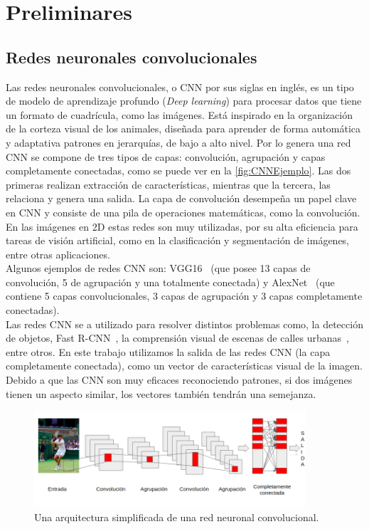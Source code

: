 \chapter{Preliminares}\label{cap:preliminares}


\section{Redes neuronales convolucionales} \label{sec:redesneuronalesconvolucionales}
Las redes neuronales convolucionales, o CNN por sus siglas en inglés, es un tipo de modelo de aprendizaje profundo (\textit{Deep learning}) para procesar datos que tiene un formato de cuadrícula, como las imágenes. Está inspirado en la organización de la corteza visual de los animales, diseñada para aprender de forma automática y adaptativa patrones en jerarquías, de bajo a alto nivel. Por lo genera una red CNN se compone de tres tipos de capas: convolución, agrupación y capas completamente conectadas, como se puede ver en la \autoref{fig:CNNEjemplo}. Las dos primeras realizan extracción de características, mientras que la tercera, las relaciona  y genera una salida. La capa de convolución desempeña un papel clave en CNN y consiste de una pila de operaciones matemáticas, como la convolución. En las imágenes en 2D estas redes son muy utilizadas, por su alta eficiencia para tareas de visión artificial, como en la clasificación y segmentación de imágenes, entre otras aplicaciones.\\

Algunos ejemplos de redes CNN son: VGG16~\cite{simonyan2014very} (que posee 13 capas de convolución, 5 de agrupación y una totalmente conectada) y AlexNet~\cite{krizhevsky2012imagenet} (que contiene 5 capas convolucionales, 3 capas de agrupación y 3 capas completamente conectadas).\\

Las redes CNN se a utilizado para resolver distintos problemas como, la detección de objetos, Fast R-CNN~\cite{girshick2015fast}, la comprensión visual de escenas de calles urbanas~\cite{cordts2016cityscapes}, entre otros. En este trabajo utilizamos la salida de las redes CNN (la capa completamente conectada), como un vector de características visual de la imagen. Debido a que las CNN son muy eficaces reconociendo patrones, si dos imágenes tienen un aspecto similar, los vectores también tendrán una semejanza.

\begin{figure}
	\centering
	\includegraphics[width=0.9\textwidth]{img/red_cnn.png}
	\caption{Una arquitectura simplificada de una red neuronal convolucional.}
	\label{fig:CNNEjemplo}
\end{figure}

